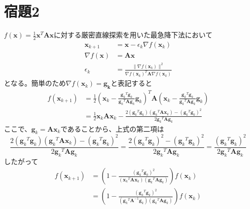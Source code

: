 \documentclass[10pt,a4paper]{ltjsarticle}       %
\begin{document}
    \section{宿題2}
    $f(\bm{x}) = \frac{1}{2}\bm{x}^T\bm{A}\bm{x}$に対する厳密直線探索を用いた最急降下法において
    \begin{align}
    \bm{x}_{k+1} &= \bm{x} - \epsilon_k\nabla f(\bm{x}_k) \\
    \nabla f(\bm{x}) &= \bm{A}\bm{x} \\
    \epsilon_{k} &= \frac{\|\nabla f(\bm{x}_k)\|^2}{\nabla f(\bm{x}_k)^T\bm{A}\nabla f(\bm{x}_k)}
    \end{align}
    となる。簡単のため$\nabla f(\bm{x}_k) = \bm{g_k}$と表記すると
    \begin{align}
    f(\bm{x}_{k+1}) &= \frac{1}{2} \left( 
        \bm{x}_k - \frac{
                                   {\bm{g}_k}^T {\bm{g}_k}
                                }{ 
                                   {\bm{g}_k}^T \bm{A}  \bm{g}_k 
                                } \bm{g}_k 
       \right)^T \bm{A}  \left( 
       \bm{x}_k - \frac{
                                 {\bm{g}_k}^T {\bm{g}_k}
                               }{ 
                                 {\bm{g}_k}^T \bm{A}  \bm{g}_k 
                               } \bm{g}_k \right) \\
    &= \frac{1}{2} \bm{x}_k \bm{A} \bm{x}_k - \frac{
                                                                             2 \left({\bm{g}_k}^T \bm{g}_k\right) \left( {\bm{g}_k}^T \bm{A}\bm{x}_k \right) - \left( {\bm{g}_k}^T \bm{g}_k \right)^2 }{ 2{\bm{g}_k}^T \bm{A}\bm{g}_k }
    \end{align}
    ここで、$\bm{g}_k = \bm{A}\bm{x}_k$であることから、上式の第二項は
    \begin{equation}
    \frac{
      2\left( {\bm{g}_k}^T \bm{g}_k \right) \left( {\bm{g}_k}^T \bm{A}\bm{x}_k \right) - \left( {\bm{g}_k}^T \bm{g}_k \right)^2
    }{
      2{\bm{g}_k}^T \bm{A}\bm{g}_k
    } = \frac{
      2\left( {\bm{g}_k}^T \bm{g}_k \right)^2 - \left( {\bm{g}_k}^T \bm{g}_k \right)^2
    }{
      2{\bm{g}_k}^T \bm{A}\bm{g}_k
    } = \frac{
      \left( {\bm{g}_k}^T \bm{g}_k \right)^2
    }{
      2{\bm{g}_k}^T \bm{A}\bm{g}_k
    }
    \end{equation}
    したがって
    \begin{align}
      f(\bm{x}_{k+1}) &= \left( 1 - \frac{
        \left( {\bm{g}_k}^T \bm{g}_k \right)^2
      }{
        \left( {\bm{x}_k}^T \bm{A}\bm{x}_k  \right) \left( {\bm{g}_k}^T \bm{A}\bm{g}_k \right)
      } \right)f(\bm{x}_k) \\
      &= \left( 1 - \frac{
        \left( {\bm{g}_k}^T \bm{g}_k \right)^2
      }{
        \left( {\bm{g}_k}^T \bm{A}^{-1}\bm{g}_k  \right) \left( {\bm{g}_k}^T \bm{A}\bm{g}_k \right)
      } \right)f(\bm{x}_k)
    \end{align}
\end{document}

